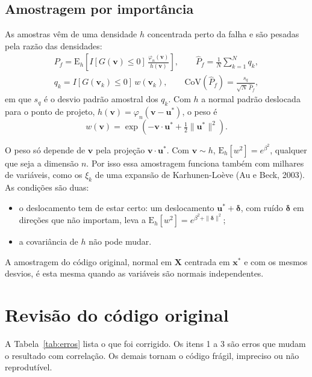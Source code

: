 \documentclass[11pt,a4paper]{article}
\newcommand{\E}{\mathrm{E}}
\newcommand{\cv}{\mathrm{CoV}}
\begin{document}
\subsection{Amostragem por importância}
\label{sec:is}
As amostras vêm de uma densidade $h$ concentrada perto da falha e são pesadas pela razão das densidades:
\begin{equation}
  \begin{gathered}
  P_f = \E_h\!\left[I[G(\bm v) \leq 0]\, \frac{\varphi_n(\bm v)}{h(\bm v)}\right], \qquad
  \hat P_f = \frac1N \sum_{k=1}^N q_k, \\
  q_k = I[G(\bm v_k) \leq 0]\, w(\bm v_k), \qquad \cv(\hat P_f) = \frac{s_q}{\sqrt N\, \hat P_f},
  \end{gathered}
\end{equation}
em que $s_q$ é o desvio padrão amostral dos $q_k$. Com $h$ a normal padrão deslocada para o ponto de projeto,
$h(\bm v) = \varphi_n(\bm v - \bm u^*)$, o peso é
\begin{equation}
  w(\bm v) = \exp\!\left(-\bm v \cdot \bm u^* + \tfrac12 \|\bm u^*\|^2\right).
\end{equation}

O peso só depende de $\bm v$ pela projeção $\bm v \cdot \bm u^*$. Com $\bm v \sim h$, $\E_h[w^2] = e^{\beta^2}$,
qualquer que seja a dimensão $n$. Por isso essa amostragem funciona também com milhares de variáveis, como os $\xi_k$
de uma expansão de Karhunen-Loève (Au e Beck, 2003). As condições são duas:
\begin{itemize}
  \item o deslocamento tem de estar certo: um deslocamento $\bm u^* + \bm\delta$, com ruído $\bm\delta$ em direções
    que não importam, leva a $\E_h[w^2] = e^{\beta^2 + \|\bm\delta\|^2}$;
  \item a covariância de $h$ não pode mudar.
\end{itemize}

A amostragem do código original, normal em $\bm X$ centrada em $\bm x^*$ e com os mesmos desvios, é esta mesma quando as
variáveis são normais independentes.

\section{Revisão do código original}
\label{sec:revisao}

A Tabela~\ref{tab:erros} lista o que foi corrigido. Os itens 1 a 3 são erros que mudam o resultado com correlação. Os
demais tornam o código frágil, impreciso ou não reprodutível.
\end{document}
